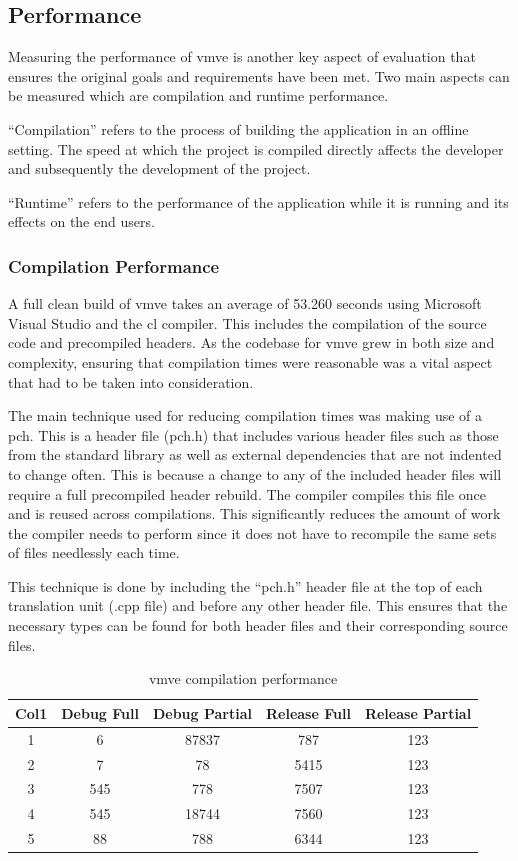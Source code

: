 \documentclass[11pt]{article}
\begin{document}
\subsection{Performance}
Measuring the performance of \gls*{vmve} is another key aspect of evaluation that
ensures the original goals and requirements have been met. Two main aspects can
be measured which are compilation and runtime performance.

``Compilation'' refers to the process of building the application in an offline
setting. The speed at which the project is compiled directly affects the
developer and subsequently the development of the project.

``Runtime'' refers to the performance of the application while it is running and
its effects on the end users.


\subsubsection{Compilation Performance}
A full clean build of \gls*{vmve} takes an average of 53.260 seconds using
Microsoft Visual Studio and the \gls*{cl} compiler. This includes the compilation
of the source code and precompiled headers. As the codebase for \gls*{vmve} grew
in both size and complexity, ensuring that compilation times were reasonable was
a vital aspect that had to be taken into consideration.

The main technique used for reducing compilation times was making use of a
\gls*{pch}. This is a header file (pch.h) that includes various header files such
as those from the standard library as well as external dependencies that are not
indented to change often. This is because a change to any of the included header
files will require a full precompiled header rebuild. The compiler compiles this
file once and is reused across compilations. This significantly reduces the
amount of work the compiler needs to perform since it does not have to recompile
the same sets of files needlessly each time.

This technique is done by including the ``pch.h'' header file at the top of each
translation unit (.cpp file) and before any other header file. This ensures that
the necessary types can be found for both header files and their corresponding
source files.

\begin{table}[H]
\centering
\begin{tabular}{||c c c c c ||} 
  \hline
  Col1 & Debug Full & Debug Partial  & Release Full & Release Partial \\ [0.5ex] 
  \hline\hline
  1 & 6 & 87837 & 787 & 123 \\ 
  2 & 7 & 78 & 5415 & 123 \\
  3 & 545 & 778 & 7507 & 123 \\
  4 & 545 & 18744 & 7560 & 123  \\
  5 & 88 & 788 & 6344 & 123 \\ [1ex] 
  \hline
\end{tabular}
\caption{\gls*{vmve} compilation performance}
\label{fig:compilation_performance}
\end{table}
\end{document}
